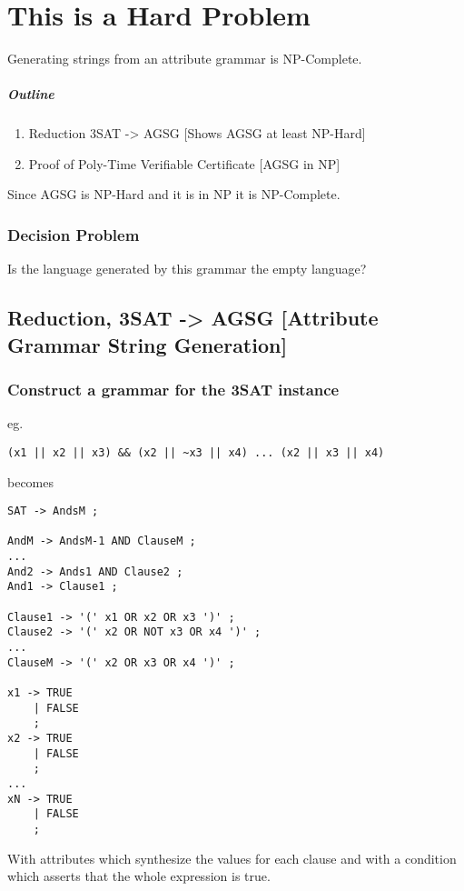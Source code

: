
\section{This is a Hard Problem}

Generating strings from an attribute grammar is NP-Complete.

\subparagraph{Outline}

\begin{enumerate}[1.]
\item
  Reduction 3SAT -\textgreater{} AGSG {[}Shows AGSG at least NP-Hard{]}
\item
  Proof of Poly-Time Verifiable Certificate {[}AGSG in NP{]}
\end{enumerate}
Since AGSG is NP-Hard and it is in NP it is NP-Complete.

\subsubsection{Decision Problem}

Is the language generated by this grammar the empty language?

\subsection{Reduction, 3SAT -\textgreater{} AGSG {[}Attribute Grammar
String Generation{]}}

\subsubsection{Construct a grammar for the 3SAT instance}

eg.

\begin{verbatim}
(x1 || x2 || x3) && (x2 || ~x3 || x4) ... (x2 || x3 || x4)
\end{verbatim}
becomes

\begin{verbatim}
SAT -> AndsM ;

AndM -> AndsM-1 AND ClauseM ;
...
And2 -> Ands1 AND Clause2 ;
And1 -> Clause1 ;

Clause1 -> '(' x1 OR x2 OR x3 ')' ;
Clause2 -> '(' x2 OR NOT x3 OR x4 ')' ;
...
ClauseM -> '(' x2 OR x3 OR x4 ')' ;

x1 -> TRUE
    | FALSE
    ;
x2 -> TRUE
    | FALSE
    ;
...
xN -> TRUE
    | FALSE
    ;
\end{verbatim}
With attributes which synthesize the values for each clause and with a
condition which asserts that the whole expression is true.

